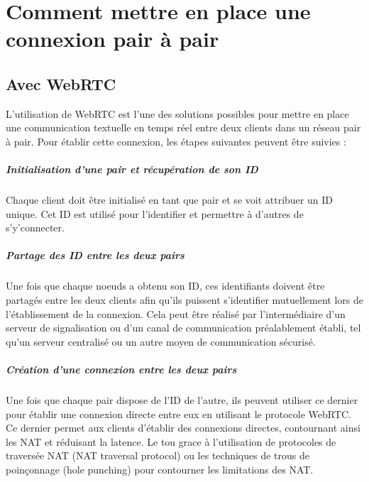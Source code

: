\chapter{Comment mettre en place une connexion pair à pair}

\section{Avec WebRTC}

L'utilisation de WebRTC est l'une des solutions possibles pour mettre en place une communication textuelle en temps réel entre deux clients dans un réseau pair à pair.
Pour établir cette connexion, les étapes suivantes peuvent être suivies :

\paragraph{Initialisation d'une pair et récupération de son ID}

Chaque client doit être initialisé en tant que pair et se voit attribuer un ID unique. Cet ID est utilisé pour l'identifier et permettre à d'autres de s'y'connecter.

\paragraph{Partage des ID entre les deux pairs}

Une fois que chaque noeuds a obtenu son ID, ces identifiants doivent être partagés entre les deux clients afin qu'ils puissent s'identifier mutuellement lors de l'établissement de la connexion. 
Cela peut être réalisé par l'intermédiaire d'un serveur de signalisation ou d'un canal de communication préalablement établi, tel qu'un serveur centralisé ou un autre moyen de communication sécurisé.

\paragraph{Création d'une connexion entre les deux pairs}

Une fois que chaque pair dispose de l'ID de l'autre, ils peuvent utiliser ce dernier pour établir une connexion directe entre eux en utilisant le protocole WebRTC. Ce dernier permet aux clients d'établir des connexions directes,
contournant ainsi les NAT et réduisant la latence. Le tou grace à l'utilisation de protocoles de traversée NAT (NAT traversal protocol) ou les techniques de trous de poinçonnage (hole punching) pour contourner les limitations des NAT.


